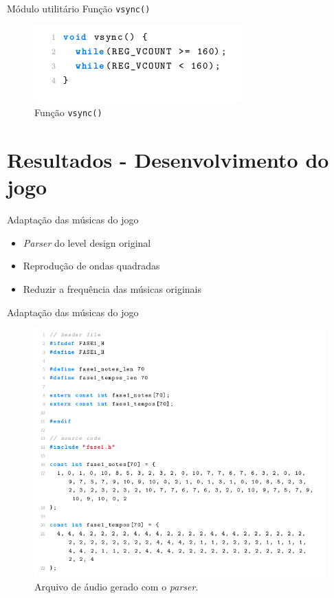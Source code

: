 \documentclass[notes, mathserif]{beamer}
\begin{document}
\begin{frame}{M\'odulo utilit\'ario}
	Fun\c c\~ao \texttt{vsync()}
	\begin{figure}[H]
		\includegraphics[width=.5\linewidth]{figuras/vsync.png}
		\centering
		\caption{Fun\c c\~ao \texttt{vsync()}}
		\label{fig:vsync}
	\end{figure}
\end{frame}

\section{Resultados - Desenvolvimento do jogo}

\begin{frame}{Adapta\c c\~ao das m\'usicas do jogo}
	\begin{itemize}[<+->]
		\item \textit{Parser} do level design original
		\item Reprodu\c c\~ao de ondas quadradas
		\item Reduzir a frequ\^encia das m\'usicas originais
	\end{itemize}
\end{frame}

\begin{frame}{Adapta\c c\~ao das m\'usicas do jogo}
	\begin{figure}[H]
		\includegraphics[width=.6\linewidth]{figuras/parsed-audio.png}
		\centering
		\caption{Arquivo de \'audio gerado com o \textit{parser}.}
		\label{fig:vsync}
	\end{figure}
\end{frame}
\end{document}
